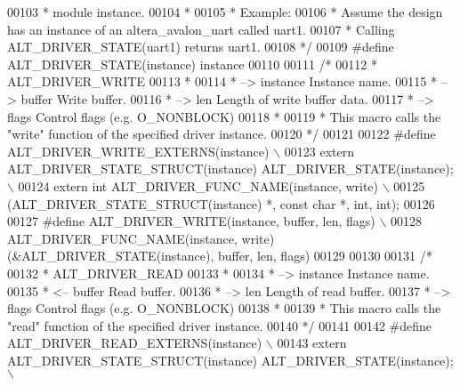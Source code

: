 \begin{DoxyCode}
00103 \textcolor{comment}{ * module instance.}
00104 \textcolor{comment}{ *}
00105 \textcolor{comment}{ * Example:}
00106 \textcolor{comment}{ *   Assume the design has an instance of an altera\_avalon\_uart called uart1.}
00107 \textcolor{comment}{ *   Calling ALT\_DRIVER\_STATE(uart1) returns uart1.}
00108 \textcolor{comment}{ */}
00109 \textcolor{preprocessor}{#define ALT\_DRIVER\_STATE(instance) instance}
00110 
00111 \textcolor{comment}{/*}
00112 \textcolor{comment}{ * ALT\_DRIVER\_WRITE}
00113 \textcolor{comment}{ *}
00114 \textcolor{comment}{ *   --> instance               Instance name.}
00115 \textcolor{comment}{ *   --> buffer                 Write buffer.}
00116 \textcolor{comment}{ *   --> len                    Length of write buffer data.}
00117 \textcolor{comment}{ *   --> flags                  Control flags (e.g. O\_NONBLOCK)}
00118 \textcolor{comment}{ *}
00119 \textcolor{comment}{ * This macro calls the "write" function of the specified driver instance.}
00120 \textcolor{comment}{ */}
00121 
00122 \textcolor{preprocessor}{#define ALT\_DRIVER\_WRITE\_EXTERNS(instance)                                  \(\backslash\)}
00123 \textcolor{preprocessor}{    extern ALT\_DRIVER\_STATE\_STRUCT(instance) ALT\_DRIVER\_STATE(instance);    \(\backslash\)}
00124 \textcolor{preprocessor}{    extern int ALT\_DRIVER\_FUNC\_NAME(instance, write)                        \(\backslash\)}
00125 \textcolor{preprocessor}{      (ALT\_DRIVER\_STATE\_STRUCT(instance) *, const char *, int, int);}
00126 
00127 \textcolor{preprocessor}{#define ALT\_DRIVER\_WRITE(instance, buffer, len, flags)                      \(\backslash\)}
00128 \textcolor{preprocessor}{    ALT\_DRIVER\_FUNC\_NAME(instance, write)(&ALT\_DRIVER\_STATE(instance), buffer, len, flags)}
00129 
00130 
00131 \textcolor{comment}{/*}
00132 \textcolor{comment}{ * ALT\_DRIVER\_READ}
00133 \textcolor{comment}{ *}
00134 \textcolor{comment}{ *   --> instance               Instance name.}
00135 \textcolor{comment}{ *   <-- buffer                 Read buffer.}
00136 \textcolor{comment}{ *   --> len                    Length of read buffer.}
00137 \textcolor{comment}{ *   --> flags                  Control flags (e.g. O\_NONBLOCK)}
00138 \textcolor{comment}{ *}
00139 \textcolor{comment}{ * This macro calls the "read" function of the specified driver instance.}
00140 \textcolor{comment}{ */}
00141 
00142 \textcolor{preprocessor}{#define ALT\_DRIVER\_READ\_EXTERNS(instance)                                   \(\backslash\)}
00143 \textcolor{preprocessor}{    extern ALT\_DRIVER\_STATE\_STRUCT(instance) ALT\_DRIVER\_STATE(instance);    \(\backslash\)}

\end{DoxyCode}
